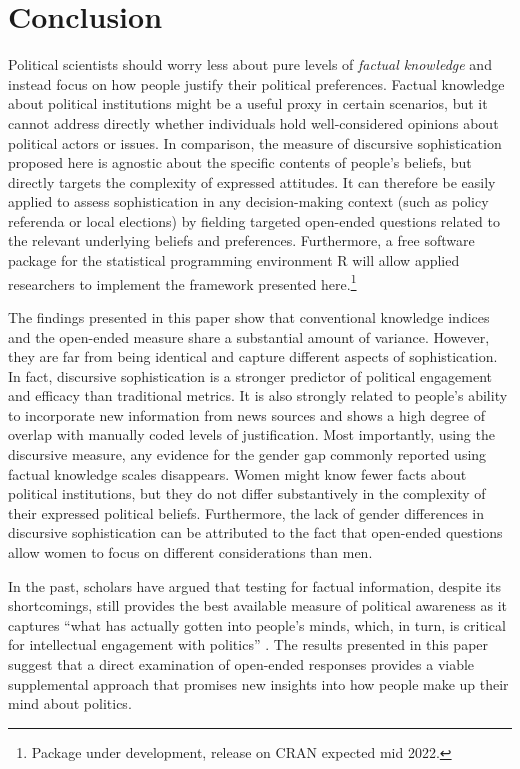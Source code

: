 \section*{Conclusion}

Political scientists should worry less about pure levels of \textit{factual knowledge} and instead focus on how people justify their political preferences. Factual knowledge about political institutions might be a useful proxy in certain scenarios, but it cannot address directly whether individuals hold well-considered opinions about political actors or issues. In comparison, the measure of discursive sophistication proposed here is agnostic about the specific contents of people's beliefs, but directly targets the complexity of expressed attitudes. It can therefore be easily applied to assess sophistication in any decision-making context (such as policy referenda or local elections) by fielding targeted open-ended questions related to the relevant underlying beliefs and preferences. Furthermore, a free software package for the statistical programming environment R will allow applied researchers to implement the framework presented here.\footnote{Package under development, release on CRAN expected mid 2022.}

The findings presented in this paper show that conventional knowledge indices and the open-ended measure share a substantial amount of variance. However, they are far from being identical and capture different aspects of sophistication. In fact, discursive sophistication is a stronger predictor of political engagement and efficacy than traditional metrics. It is also strongly related to people's ability to incorporate new information from news sources and shows a high degree of overlap with manually coded levels of justification. Most importantly, using the discursive measure, any evidence for the gender gap commonly reported using factual knowledge scales disappears. Women might know fewer facts about political institutions, but they do not differ substantively in the complexity of their expressed political beliefs. Furthermore, the lack of gender differences in discursive sophistication can be attributed to the fact that open-ended questions allow women to focus on different considerations than men.

In the past, scholars have argued that testing for factual information, despite its shortcomings, still provides the best available measure of political awareness as it captures ``what has actually gotten into people's minds, which, in turn, is critical for intellectual engagement with politics'' \citet[21]{zaller1992nature}. The results presented in this paper suggest that a direct examination of open-ended responses provides a viable supplemental approach that promises new insights into how people make up their mind about politics.

\clearpage
\singlespacing

